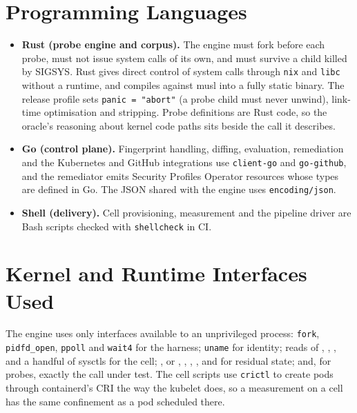 \section{Programming Languages}

\begin{itemize}[leftmargin=*]
\item \textbf{Rust (probe engine and corpus).} The engine must fork before each probe, must not issue system calls of its own, and must survive a child killed by SIGSYS. Rust gives direct control of system calls through \texttt{nix} and \texttt{libc} without a runtime, and compiles against musl into a fully static binary. The release profile sets \texttt{panic = "abort"} (a probe child must never unwind), link-time optimisation and stripping. Probe definitions are Rust code, so the oracle's reasoning about kernel code paths sits beside the call it describes.
\item \textbf{Go (control plane).} Fingerprint handling, diffing, evaluation, remediation and the Kubernetes and GitHub integrations use \texttt{client-go} and \texttt{go-github}, and the remediator emits Security Profiles Operator resources whose types are defined in Go. The JSON shared with the engine uses \texttt{encoding/json}.
\item \textbf{Shell (delivery).} Cell provisioning, measurement and the pipeline driver are Bash scripts checked with \texttt{shellcheck} in CI.
\end{itemize}

\section{Kernel and Runtime Interfaces Used}

The engine uses only interfaces available to an unprivileged process: \texttt{fork}, \texttt{pidfd\_open}, \texttt{ppoll} and \texttt{wait4} for the harness; \texttt{uname} for identity; reads of , , ,  and a handful of sysctls for the cell; ,  or , , , ,  and  for residual state; and, for probes, exactly the call under test. The cell scripts use \texttt{crictl} to create pods through containerd's CRI the way the kubelet does, so a measurement on a cell has the same confinement as a pod scheduled there.

